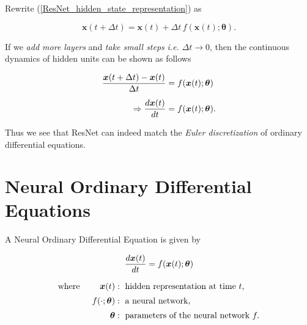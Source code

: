 Rewrite (\ref{ResNet_hidden_state_representation}) as

$$\boldsymbol{x}(t+\Delta t) = \boldsymbol{x}(t)+\Delta t\, f(\boldsymbol{x}(t); \boldsymbol{\theta}).$$

If we \textit{add more layers} and \textit{take small steps} \textit{i.e.} $\Delta t \rightarrow 0$, then the
continuous dynamics of hidden units can be shown as follows \cite{chen2019neuralordinarydifferentialequations}

\begin{align}
\dfrac{\boldsymbol{x}(t + \Delta t) - \boldsymbol{x}(t)}{\Delta t} &= f(\boldsymbol{x}(t); \boldsymbol{\theta}) \nonumber \\[0.5em]
\Rightarrow \dfrac{d \boldsymbol{x}(t)}{dt} &= f(\boldsymbol{x}(t); \boldsymbol{\theta}).
\end{align}

Thus we see that ResNet can indeed match the \textit{Euler discretization} of ordinary differential equations.


\section{Neural Ordinary Differential Equations}

A Neural Ordinary Differential Equation is given by

\begin{equation}\label{NeuralODE}
\dfrac{d \boldsymbol{x}(t)}{dt} = f(\boldsymbol{x}(t); \boldsymbol{\theta})
\end{equation}

\begin{align*}
\text{where } \qquad \boldsymbol{x}(t) &: \text{ hidden representation at time }t, \\[0.2em]
f(\cdot; \boldsymbol{\theta}) &: \text{ a neural network}, \\[0.2em]
\boldsymbol{\theta} &: \text{ parameters of the neural network } f.
\end{align*}



